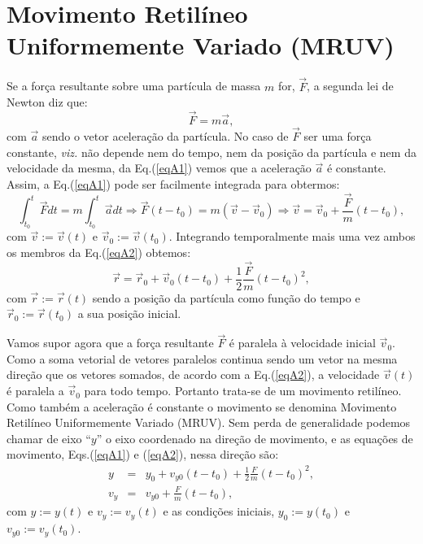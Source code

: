 
\chapter   {Movimento Retilíneo Uniformemente Variado (MRUV)}
\label{sec:mruv}
\vspace{-0.7cm}

Se a força resultante sobre uma partícula de massa $m$ for, $\vec{F}$, a  segunda lei de Newton diz que:
\begin{equation}
\label{eqA1}
\vec{F}=m\vec{a},
\end{equation}
com $\vec{a}$ sendo o vetor aceleração da partícula. No caso de $\vec{F}$ ser uma força constante,
{\it viz.} não depende nem do tempo, nem da posição da partícula e nem da velocidade da mesma, da Eq.(\ref{eqA1}) vemos que 
a aceleração $\vec{a}$ é constante. Assim, a Eq.(\ref{eqA1}) pode ser facilmente integrada para obtermos:
\begin{equation}
\label{eqA2}
\int_{t_0}^{t}\vec{F}dt=m\int_{t_0}^{t} \vec{a}dt\Longrightarrow \vec{F}(t-t_0)=m(\vec{v}-\vec{v}_0)
\Longrightarrow \vec{v}=\vec{v}_0+\frac{\vec{F}}{m} (t-t_0),
\end{equation}
com $\vec{v}:=\vec{v}(t)$ e $\vec{v}_0:=\vec{v}(t_0)$.
Integrando temporalmente mais uma vez ambos os membros da Eq.(\ref{eqA2}) obtemos:
\begin{equation}
\vec{r}=\vec{r}_0+\vec{v}_0(t-t_0)+\frac{1}{2}\frac{\vec{F}}{m}(t-t_0)^2,
\end{equation}
com $\vec{r}:=\vec{r}(t)$ sendo a posição da partícula como função do tempo e 
$\vec{r}_0:=\vec{r}(t_0)$ a sua posição inicial.
\par
Vamos supor agora que a força resultante 
$\vec{F}$ é paralela à velocidade inicial $\vec{v}_0$. Como a soma vetorial de vetores paralelos 
continua sendo um vetor na mesma direção que os vetores somados, de acordo com a Eq.(\ref{eqA2}), a velocidade $\vec{v}(t)$ é paralela a $\vec{v}_0$ para todo tempo. Portanto trata-se 
de um movimento retilíneo. Como também a aceleração é constante o movimento se denomina 
Movimento Retilíneo Uniformemente Variado (MRUV). Sem perda de generalidade podemos 
chamar de eixo ``$y$'' o eixo coordenado na direção de movimento,  e as equações de movimento,  Eqs.(\ref{eqA1}) e (\ref{eqA2}), nessa direção são:
\begin{eqnarray}
y&=&y_0+v_{y0}(t-t_0) +\frac{1}{2} \frac{F}{m}(t-t_0)^2,\\
v_y&=&v_{y0}+\frac{F}{m}(t-t_0),
\end{eqnarray}
com $y:=y(t)$ e $v_y:=v_y(t)$ e as condições iniciais, $y_0:=y(t_0)$ e $v_{y0}:=v_y(t_0)$.


